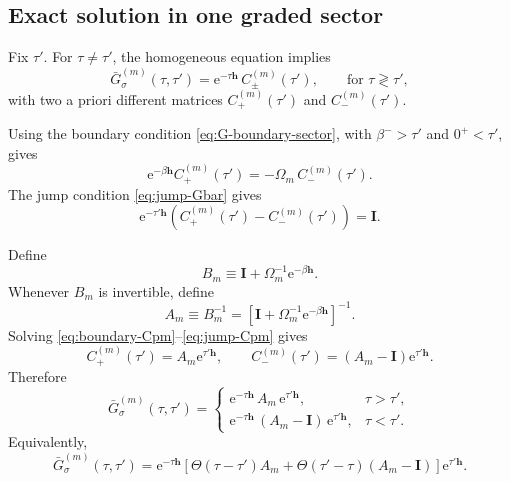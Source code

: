 \documentclass[11pt]{article}
\newcommand{\e}{\mathrm{e}}
\newcommand{\1}{\mathds{1}}
\newcommand{\bh}{\bm{h}}
\newcommand{\bI}{\bm{I}}
\newcommand{\br}[1]{\left(#1\right)}
\newcommand{\sq}[1]{\left[#1\right]}
\begin{document}
\subsection{Exact solution in one graded sector}

Fix $\tau'$. For $\tau\neq\tau'$, the homogeneous equation implies
\begin{equation}
\bar G_\sigma^{(m)}(\tau,\tau')
=
\e^{-\tau\bh}\,C_\pm^{(m)}(\tau'),
\qquad
\text{for } \tau\gtrless\tau',
\label{eq:piecewise-homogeneous}
\end{equation}
with two a priori different matrices $C_+^{(m)}(\tau')$ and
$C_-^{(m)}(\tau')$.

Using the boundary condition \eqref{eq:G-boundary-sector}, with
$\beta^- > \tau'$ and $0^+<\tau'$, gives
\begin{equation}
\e^{-\beta\bh} C_+^{(m)}(\tau')
=
-\Omega_m\, C_-^{(m)}(\tau').
\label{eq:boundary-Cpm}
\end{equation}
The jump condition \eqref{eq:jump-Gbar} gives
\begin{equation}
\e^{-\tau' \bh}
\br{C_+^{(m)}(\tau')-C_-^{(m)}(\tau')}
=
\bI.
\label{eq:jump-Cpm}
\end{equation}

Define
\begin{equation}
B_m\equiv \bI+\Omega_m^{-1}\e^{-\beta\bh}.
\label{eq:Bm-def}
\end{equation}
Whenever $B_m$ is invertible, define
\begin{equation}
A_m\equiv B_m^{-1}
=
\sq{\bI+\Omega_m^{-1}\e^{-\beta\bh}}^{-1}.
\label{eq:Am-def}
\end{equation}
Solving \eqref{eq:boundary-Cpm}--\eqref{eq:jump-Cpm} gives
\begin{equation}
C_+^{(m)}(\tau') = A_m \e^{\tau'\bh},
\qquad
C_-^{(m)}(\tau') = \br{A_m-\bI}\e^{\tau'\bh}.
\label{eq:Cpm-solution}
\end{equation}
Therefore
\begin{equation}
\boxed{
\bar G_\sigma^{(m)}(\tau,\tau')
=
\begin{cases}
\e^{-\tau\bh}\,A_m\,\e^{\tau'\bh},
& \tau>\tau',\\[6pt]
\e^{-\tau\bh}\,\br{A_m-\bI}\,\e^{\tau'\bh},
& \tau<\tau'.
\end{cases}
}
\label{eq:Gm-piecewise}
\end{equation}
Equivalently,
\begin{equation}
\boxed{
\bar G_\sigma^{(m)}(\tau,\tau')
=
\e^{-\tau\bh}
\sq{
\Theta(\tau-\tau')A_m
+
\Theta(\tau'-\tau)\br{A_m-\bI}
}
\e^{\tau'\bh}.
}
\label{eq:Gm-step-function}
\end{equation}
\end{document}
